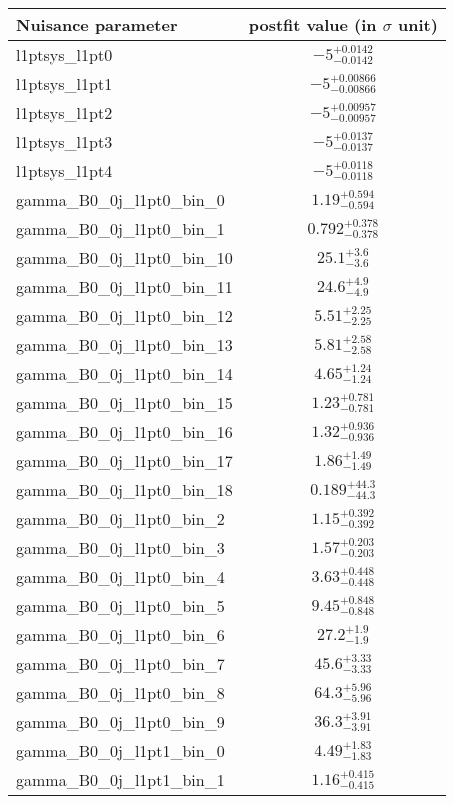 
\begin{tabular}{|l|c|}
\hline
Nuisance parameter & postfit value (in $\sigma$ unit) \\\hline
l1ptsys\_l1pt0 & $-5^{+0.0142}_{-0.0142}$ \\
l1ptsys\_l1pt1 & $-5^{+0.00866}_{-0.00866}$ \\
l1ptsys\_l1pt2 & $-5^{+0.00957}_{-0.00957}$ \\
l1ptsys\_l1pt3 & $-5^{+0.0137}_{-0.0137}$ \\
l1ptsys\_l1pt4 & $-5^{+0.0118}_{-0.0118}$ \\
gamma\_B0\_0j\_l1pt0\_bin\_0 & $1.19^{+0.594}_{-0.594}$ \\
gamma\_B0\_0j\_l1pt0\_bin\_1 & $0.792^{+0.378}_{-0.378}$ \\
gamma\_B0\_0j\_l1pt0\_bin\_10 & $25.1^{+3.6}_{-3.6}$ \\
gamma\_B0\_0j\_l1pt0\_bin\_11 & $24.6^{+4.9}_{-4.9}$ \\
gamma\_B0\_0j\_l1pt0\_bin\_12 & $5.51^{+2.25}_{-2.25}$ \\
gamma\_B0\_0j\_l1pt0\_bin\_13 & $5.81^{+2.58}_{-2.58}$ \\
gamma\_B0\_0j\_l1pt0\_bin\_14 & $4.65^{+1.24}_{-1.24}$ \\
gamma\_B0\_0j\_l1pt0\_bin\_15 & $1.23^{+0.781}_{-0.781}$ \\
gamma\_B0\_0j\_l1pt0\_bin\_16 & $1.32^{+0.936}_{-0.936}$ \\
gamma\_B0\_0j\_l1pt0\_bin\_17 & $1.86^{+1.49}_{-1.49}$ \\
gamma\_B0\_0j\_l1pt0\_bin\_18 & $0.189^{+44.3}_{-44.3}$ \\
gamma\_B0\_0j\_l1pt0\_bin\_2 & $1.15^{+0.392}_{-0.392}$ \\
gamma\_B0\_0j\_l1pt0\_bin\_3 & $1.57^{+0.203}_{-0.203}$ \\
gamma\_B0\_0j\_l1pt0\_bin\_4 & $3.63^{+0.448}_{-0.448}$ \\
gamma\_B0\_0j\_l1pt0\_bin\_5 & $9.45^{+0.848}_{-0.848}$ \\
gamma\_B0\_0j\_l1pt0\_bin\_6 & $27.2^{+1.9}_{-1.9}$ \\
gamma\_B0\_0j\_l1pt0\_bin\_7 & $45.6^{+3.33}_{-3.33}$ \\
gamma\_B0\_0j\_l1pt0\_bin\_8 & $64.3^{+5.96}_{-5.96}$ \\
gamma\_B0\_0j\_l1pt0\_bin\_9 & $36.3^{+3.91}_{-3.91}$ \\
gamma\_B0\_0j\_l1pt1\_bin\_0 & $4.49^{+1.83}_{-1.83}$ \\
gamma\_B0\_0j\_l1pt1\_bin\_1 & $1.16^{+0.415}_{-0.415}$ \\

\end{tabular}
